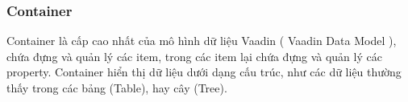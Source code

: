 \subsubsection{Container}
Container là cấp cao nhất của mô hình dữ liệu Vaadin ( Vaadin Data Model ), chứa đựng và quản lý các item, trong các item lại chứa đựng và quản lý các property. Container hiển thị dữ liệu dưới dạng cấu trúc, như các dữ liệu thường thấy trong các bảng (Table), hay cây (Tree).